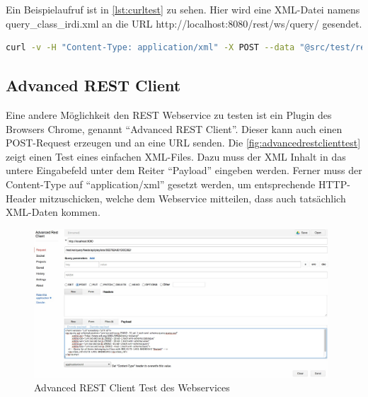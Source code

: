 Ein Beispielaufruf ist in \autoref{lst:curltest} zu sehen. Hier wird eine XML-Datei namens query\_class\_irdi.xml an die URL http://localhost:8080/rest/ws/query/ gesendet. 

\begin{lstlisting}[caption=CURL Test des REST Webservices, language=sh, label=lst:curltest]
curl -v -H "Content-Type: application/xml" -X POST --data "@src/test/resources/de/feu/plib/xml/query_class_irdi.xml" http://localhost:8080/rest/ws/query
 \end{lstlisting}   

\subsection{Advanced REST Client} 

Eine andere Möglichkeit den \gls{REST} Webservice zu testen ist ein Plugin des Browsers Chrome, genannt \enquote{Advanced REST Client}. Dieser kann auch einen POST-Request erzeugen und an eine URL senden. Die \autoref{fig:advancedrestclienttest} zeigt einen Test eines einfachen XML-Files. Dazu muss der XML Inhalt in das untere Eingabefeld unter dem Reiter \enquote{Payload} eingeben werden. Ferner muss der Content-Type auf \enquote{application/xml} gesetzt werden, um entsprechende HTTP-Header mitzuschicken, welche dem Webservice mitteilen, dass auch tatsächlich XML-Daten kommen. 

\begin{figure}[htbp]
	\centering
		\includegraphics[width=0.98\textwidth]{images/advanced_rest_client_test.jpg}
	\caption{Advanced REST Client Test des Webservices}
	\label{fig:advancedrestclienttest}
\end{figure}

